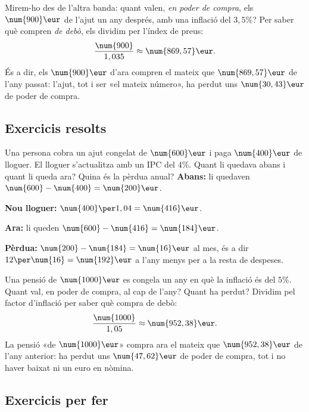 \begin{exemple}
Mirem-ho des de l'altra banda: quant valen, \emph{en poder de compra}, els
$\num{900}\eur$ de l'ajut un any després, amb una inflació del $3,5\%$? Per saber què
compren \emph{de debò}, els dividim per l'índex de preus:
\[
\frac{\num{900}}{1,035}\approx\num{869,57}\eur.
\]
És a dir, els $\num{900}\eur$ d'ara compren el mateix que $\num{869,57}\eur$ de l'any
passat: l'ajut, tot i ser «el mateix número», ha perdut uns $\num{30,43}\eur$ de poder
de compra.
\end{exemple}

\subsection{Exercicis resolts}

\begin{exresolt}
Una persona cobra un ajut congelat de $\num{600}\eur$ i paga $\num{400}\eur$ de
lloguer. El lloguer s'actualitza amb un IPC del $4\%$. Quant li quedava abans i quant
li queda ara? Quina és la pèrdua anual?
\solucio
\textbf{Abans:} li quedaven $\num{600}-\num{400}=\num{200}\eur$.

\textbf{Nou lloguer:} $\num{400}\per 1,04=\num{416}\eur$.

\textbf{Ara:} li queden $\num{600}-\num{416}=\num{184}\eur$.

\textbf{Pèrdua:} $\num{200}-\num{184}=\num{16}\eur$ al mes, és a dir
$12\per\num{16}=\num{192}\eur$ a l'any menys per a la resta de despeses.
\end{exresolt}

\begin{exresolt}
Una pensió de $\num{1000}\eur$ es congela un any en què la inflació és del $5\%$. Quant
val, en poder de compra, al cap de l'any? Quant ha perdut?
\solucio
Dividim pel factor d'inflació per saber què compra de debò:
\[
\frac{\num{1000}}{1,05}\approx\num{952,38}\eur.
\]
La pensió «de $\num{1000}\eur$» compra ara el mateix que $\num{952,38}\eur$ de l'any
anterior: ha perdut uns $\num{47,62}\eur$ de poder de compra, tot i no haver baixat ni
un euro en nòmina.
\end{exresolt}

\subsection{Exercicis per fer}

